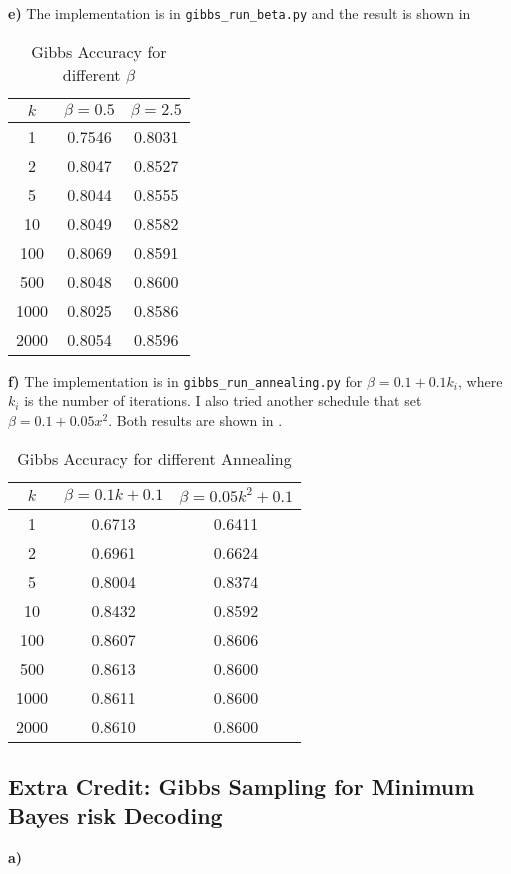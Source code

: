 \documentclass{article}
\begin{document}
\textbf{e)}
The implementation is in \texttt{gibbs\_run\_beta.py} and the result is shown in 

\begin{table}
\centering
\begin{tabular}{c|c|c}
\textbf{$k$} & \textbf{$\beta = 0.5$} & \textbf{$\beta=2.5$} \\\hline
1 & 0.7546 & 0.8031 \\\hline
2 & 0.8047 & 0.8527\\\hline
5 & 0.8044 & 0.8555 \\\hline
10 & 0.8049 & 0.8582 \\\hline
100 & 0.8069 & 0.8591 \\\hline
500 & 0.8048 & 0.8600 \\\hline
1000 & 0.8025 & 0.8586\\\hline
2000 & 0.8054 & 0.8596\\ 
\end{tabular}
\caption{Gibbs Accuracy for different $\beta$}
\label{tab:gibbsbeta}
\end{table}

\textbf{f)}
The implementation is in \texttt{gibbs\_run\_annealing.py} for $\beta = 0.1 + 0.1k_i$, where $k_i$ is 
the number of iterations. I also tried another schedule that set $\beta = 0.1 + 0.05x^2$. Both results are shown 
in .

\begin{table}
\centering
\begin{tabular}{c|c|c}
\textbf{$k$} & \textbf{$\beta = 0.1k+0.1$} & \textbf{$\beta=0.05k^2+0.1$} \\\hline
1 & 0.6713 & 0.6411 \\\hline
2 & 0.6961 & 0.6624\\\hline
5 & 0.8004 & 0.8374 \\\hline
10 & 0.8432 & 0.8592 \\\hline
100 & 0.8607 &  0.8606\\\hline
500 & 0.8613 &  0.8600\\\hline
1000 & 0.8611 & 0.8600 \\\hline
2000 & 0.8610 & 0.8600 \\
\end{tabular}
\caption{Gibbs Accuracy for different Annealing}
\label{tab:gibbsanneal}
\end{table}

\subsection{Extra Credit: Gibbs Sampling for Minimum Bayes risk Decoding}
\textbf{a)}
\end{document}
